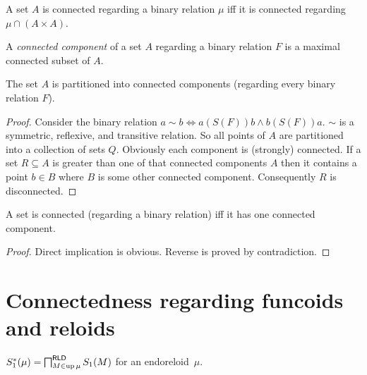 \begin{cor}
A set $A$ is connected regarding a binary relation $\mu$ iff it
is connected regarding $\mu\cap(A\times A)$.\end{cor}
\begin{defn}
A \emph{connected component} of a set
$A$ regarding a binary relation $F$ is a maximal connected subset
of $A$.\end{defn}
\begin{thm}
The set $A$ is partitioned into connected components (regarding every
binary relation $F$).\end{thm}
\begin{proof}
Consider the binary relation $a\sim b\Leftrightarrow a\mathrel{(S(F))}b\wedge b\mathrel{(S(F))}a$.
$\sim$ is a symmetric, reflexive, and transitive relation. So all
points of $A$ are partitioned into a collection of sets $Q$. Obviously
each component is (strongly) connected. If a set $R\subseteq A$ is
greater than one of that connected components $A$ then it contains
a point $b\in B$ where $B$ is some other connected component. Consequently
$R$ is disconnected.\end{proof}
\begin{prop}
A set is connected (regarding a binary relation) iff it has one connected
component.\end{prop}
\begin{proof}
Direct implication is obvious. Reverse is proved by contradiction.
\end{proof}

\section{Connectedness regarding funcoids and reloids}
\begin{defn}
$S_{1}^{\ast}(\mu)=\bigsqcap_{M\in\operatorname{up}\mu}^{\mathsf{RLD}}S_{1}(M)$
for an endoreloid~$\mu$.
\end{defn}

